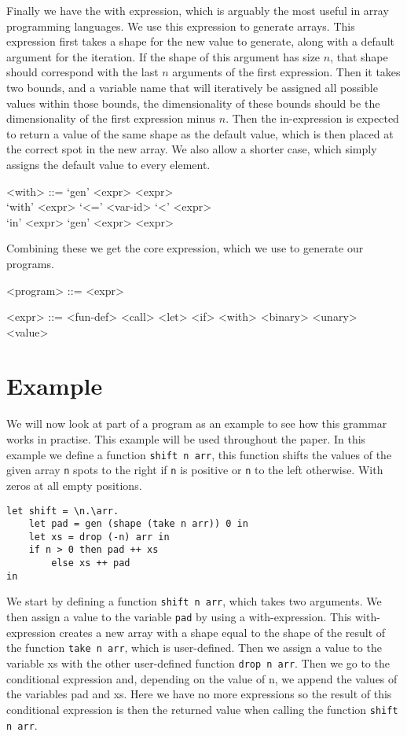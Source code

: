 \documentclass[../main.tex]{subfiles}
\begin{document}
Finally we have the with expression, which is arguably the most useful in array programming languages. We use this expression to generate arrays. This expression first takes a shape for the new value to generate, along with a default argument for the iteration. If the shape of this argument has size $n$, that shape should correspond with the last $n$ arguments of the first expression.
Then it takes two bounds, and a variable name that will iteratively be assigned all possible values within those bounds, the dimensionality of these bounds should be the dimensionality of the first expression minus $n$. Then the in-expression is expected to return a value of the same shape as the default value, which is then placed at the correct spot in the new array. We also allow a shorter case, which simply assigns the default value to every element.
\begin{grammar}
<with> ::= `gen' <expr> <expr> \\
            `with' <expr> `<=' <var-id> `<' <expr> \\
            `in' <expr>
    \alt `gen' <expr> <expr>
\end{grammar}

Combining these we get the core expression, which we use to generate our programs.
\begin{grammar}
<program> ::= <expr>

<expr> ::= <fun-def>
    \alt <call>
    \alt <let>
    \alt <if>
    \alt <with>
    \alt <binary>
    \alt <unary>
    \alt <value>
\end{grammar}

\section{Example}
We will now look at part of a program as an example to see how this grammar works in practise. This example will be used throughout the paper. In this example we define a function \texttt{shift n arr}, this function shifts the values of the given array \texttt{n} spots to the right if \texttt{n} is positive or \texttt{n} to the left otherwise. With zeros at all empty positions.
\begin{verbatim}
let shift = \n.\arr.
    let pad = gen (shape (take n arr)) 0 in
    let xs = drop (-n) arr in
    if n > 0 then pad ++ xs
        else xs ++ pad
in
\end{verbatim}

We start by defining a function \texttt{shift n arr}, which takes two arguments. We then assign a value to the variable \texttt{pad} by using a with-expression. This with-expression creates a new array with a shape equal to the shape of the result of the function \texttt{take n arr}, which is user-defined. Then we assign a value to the variable xs with the other user-defined function \texttt{drop n arr}. Then we go to the conditional expression and, depending on the value of n, we append the values of the variables pad and xs. Here we have no more expressions so the result of this conditional expression is then the returned value when calling the function \texttt{shift n arr}.
\end{document}
